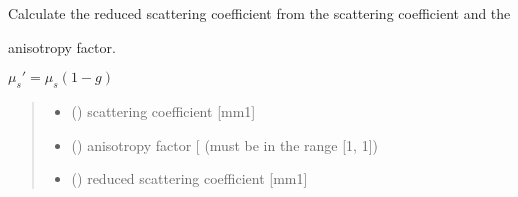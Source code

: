 \documentclass[letterpaper,10pt,english]{sphinxmanual}
\begin{document}
\begin{fulllineitems}
\label{\detokenize{04_scattering_coefficient:skinoptics.scattering_coefficient.rmus_from_mus}}
\pysigstartsignatures
{}
\pysigstopsignatures
\begin{DUlineblock}{0em}
\item[] Calculate the reduced scattering coefficient from the scattering coefficient and the 
\item[] anisotropy factor.
\end{DUlineblock}

\sphinxAtStartPar
\(\mu_s' = \mu_s (1-g)\)
\begin{quote}\begin{description}
\begin{itemize}
\item {} 
\sphinxAtStartPar
{} () \textendash{} scattering coefficient {[}mm\sphinxhyphen{}1{]}

\item {} 
\sphinxAtStartPar
{} () \textendash{} anisotropy factor {[}\sphinxhyphen{}{]} (must be in the range {[}\sphinxhyphen{}1, 1{]})

\end{itemize}

\sphinxAtStartPar
\begin{itemize}
\item {} 
\sphinxAtStartPar
{} () \textendash{} reduced scattering coefficient {[}mm\sphinxhyphen{}1{]}

\end{itemize}


\end{description}\end{quote}

\end{fulllineitems}

\end{document}

